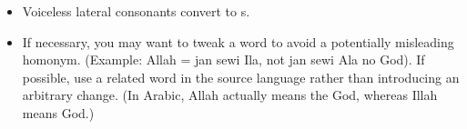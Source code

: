 \begin{itemize}
    \item Voiceless lateral consonants convert to s.
    \item If necessary, you may want to tweak a word to avoid a potentially misleading homonym.
          (Example: Allah = jan sewi Ila, not jan sewi Ala no God).
          If possible, use a related word in the source language rather than introducing an arbitrary change.
          (In Arabic, Allah actually means the God, whereas Illah means God.)
\end{itemize}

